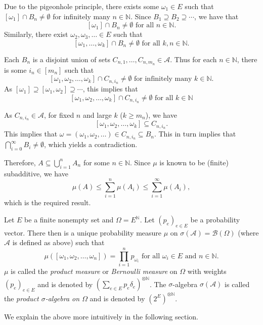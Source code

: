 Due to the pigeonhole principle, there exists some $\omega_1\in E$ such that $[\omega_1]\cap B_n\neq\emptyset$ for infinitely many $n\in\mathbb{N}$. Since $B_1\supseteq B_2\supseteq\cdots$, we have that
$$[\omega_1]\cap B_n\neq\emptyset\text{ for all }n\in\mathbb{N}.$$
Similarly, there exist $\omega_2,\omega_3,\ldots\in E$ such that
$$[\omega_1,\ldots,\omega_k]\cap B_n\neq\emptyset\text{ for all }k,n\in\mathbb{N}.$$

Each $B_n$ is a disjoint union of sets $C_{n,1},\ldots,C_{n,m_n}\in\mathcal{A}$. Thus for each $n\in\mathbb{N}$, there is some $i_n\in[m_n]$ such that
$$[\omega_1,\omega_2,\ldots,\omega_k]\cap C_{n,i_n}\neq\emptyset\text{ for infinitely many }k\in\mathbb{N}.$$
As $[\omega_1]\supseteq[\omega_1,\omega_2]\supseteq\cdots$, this implies that
$$[\omega_1,\omega_2,\ldots,\omega_k]\cap C_{n,i_n}\neq\emptyset\text{ for all } k\in\mathbb{N}$$

As $C_{n,i_n}\in\mathcal{A}$, for fixed $n$ and large $k$ ($k\geq m_n$), we have $$[\omega_1,\omega_2,\ldots,\omega_k]\subseteq C_{n,i_n}.$$
This implies that $\omega=(\omega_1,\omega_2,\ldots)\in C_{n,i_n}\subseteq B_n$. This in turn implies that $\bigcap_{i=0}^\infty B_i\neq\emptyset$, which yields a contradiction.

Therefore, $A\subseteq\bigcup_{i=1}^n A_n$ for some $n\in\mathbb{N}$. Since $\mu$ is known to be (finite) subadditive, we have
$$\mu(A)\leq \sum_{i=1}^n\mu(A_i)\leq \sum_{i=1}^\infty \mu(A_i),$$
which is the required result.

\begin{definition}
\label{defProductMeasure}
    Let $E$ be a finite nonempty set and $\Omega=E^\mathbb{N}$. Let $(p_e)_{e\in E}$ be a probability vector. There then is a unique probability measure $\mu$ on $\sigma(\mathcal{A})=\mathcal{B}(\Omega)$ (where $\mathcal{A}$ is defined as above) such that
    $$\mu([\omega_1,\omega_2,\ldots,\omega_n])=\prod_{i=1}^n p_{\omega_i}\text{ for all $\omega_i\in E$ and $n\in\mathbb{N}$}.$$
    $\mu$ is called the \textit{product measure} or \textit{Bernoulli measure} on $\Omega$ with weights $(p_e)_{e\in E}$ and is denoted by $\left(\sum_{e\in E}p_e\delta_e\right)^{\otimes\mathbb{N}}$. The $\sigma$-algebra $\sigma(\mathcal{A})$ is called the \textit{product $\sigma$-algebra on $\Omega$} and is denoted by $(2^E)^{\otimes\mathbb{N}}$.
\end{definition}

We explain the above more intuitively in the following section.
\clearpage